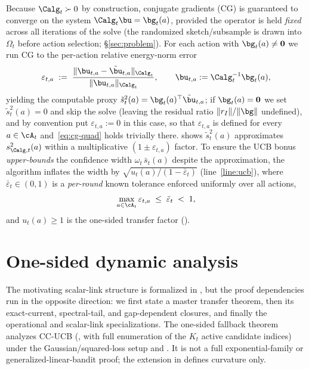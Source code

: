 Because $\Calg_t\succ 0$ by construction, conjugate gradients (CG) is guaranteed
to converge on the system $\Calg_t\bu=\bg_t(a)$, provided the operator is held
\emph{fixed} across all iterations of the solve (the randomized sketch/subsample
is drawn into $\Omega_t$ before action selection; \S\ref{sec:problem}).  For each
action with $\bg_t(a)\ne\mathbf0$ we run CG to the per-action relative
energy-norm error
\begin{equation}\label{eq:cg-err-eta}
  \varepsilon_{t,a}
  \;:=\;
  \frac{\|\bu_{t,a}-\tilde\bu_{t,a}\|_{\Calg_t}}{\|\bu_{t,a}\|_{\Calg_t}},
  \qquad
  \bu_{t,a}:=\Calg_t^{-1}\bg_t(a),
\end{equation}
yielding the computable proxy $\tilde{s}_t^2(a)=\bg_t(a)^\top\tilde\bu_{t,a}$;
if $\bg_t(a)=\mathbf0$ we set $\tilde{s}_t^2(a)=0$ and skip the solve (leaving the
residual ratio $\|r_I\|/\|\bg\|$ undefined), and by convention put
$\varepsilon_{t,a}:=0$ in this case, so that $\varepsilon_{t,a}$ is defined for
every $a\in\cA_t$ and~\eqref{eq:cg-quad} holds trivially there.
 shows $\tilde{s}_t^2(a)$ approximates $s_{\Calg,t}^2(a)$ within a
multiplicative $(1\pm\varepsilon_{t,a})$ factor.  To ensure the UCB bonus
\emph{upper-bounds} the confidence width $\omega_t\,\bar s_t(a)$ despite the
approximation, the algorithm inflates the width by
$\sqrt{u_t(a)/(1-\bar\varepsilon_t)}$ (line~\ref{line:ucb}), where
$\bar\varepsilon_t\in(0,1)$ is a \emph{per-round} known tolerance enforced
uniformly over all actions,
\begin{equation}\label{eq:cg-tol-uniform}
  \max_{a\in\cA_t}\varepsilon_{t,a}
  \;\le\;\bar\varepsilon_t\;<\;1,
\end{equation}
and $u_t(a)\ge1$ is the one-sided transfer factor ().

\section{One-sided dynamic analysis}\label{sec:theory}

The motivating scalar-link structure is formalized in
, but the proof dependencies run in the opposite
direction: we first state a master transfer theorem, then its exact-current,
spectral-tail, and gap-dependent closures, and finally the operational and
scalar-link specializations.  The one-sided fallback theorem analyzes CC-UCB
(, with full enumeration of the $K_t$ active candidate indices)
under the
Gaussian/squared-loss setup and
.  It is not a
full exponential-family or generalized-linear-bandit proof; the extension in
 defines curvature only.

